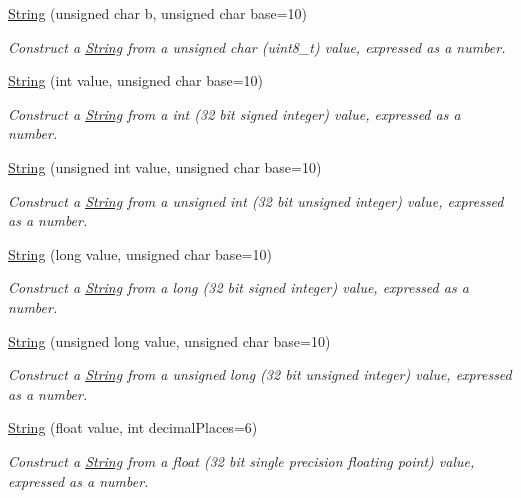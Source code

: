 \begin{DoxyCompactItemize}
\hyperlink{class_string_adb05525482f5991815322239e5504539}{String} (unsigned char b, unsigned char base=10)
\begin{DoxyCompactList}\small\item\em Construct a \hyperlink{class_string}{String} from a unsigned char (uint8\+\_\+t) value, expressed as a number. \end{DoxyCompactList}\item 
\hyperlink{class_string_a5528e1c6d322a9ee21f155c291ea67d1}{String} (int value, unsigned char base=10)
\begin{DoxyCompactList}\small\item\em Construct a \hyperlink{class_string}{String} from a int (32 bit signed integer) value, expressed as a number. \end{DoxyCompactList}\item 
\hyperlink{class_string_a53134e2b38eb0d114f886e807a3753ae}{String} (unsigned int value, unsigned char base=10)
\begin{DoxyCompactList}\small\item\em Construct a \hyperlink{class_string}{String} from a unsigned int (32 bit unsigned integer) value, expressed as a number. \end{DoxyCompactList}\item 
\hyperlink{class_string_a868687056546919b7109c0801d75ec83}{String} (long value, unsigned char base=10)
\begin{DoxyCompactList}\small\item\em Construct a \hyperlink{class_string}{String} from a long (32 bit signed integer) value, expressed as a number. \end{DoxyCompactList}\item 
\hyperlink{class_string_abdad234c756b44cce55c75db24fddecf}{String} (unsigned long value, unsigned char base=10)
\begin{DoxyCompactList}\small\item\em Construct a \hyperlink{class_string}{String} from a unsigned long (32 bit unsigned integer) value, expressed as a number. \end{DoxyCompactList}\item 
\hyperlink{class_string_adef4f199739444a78803c4043ad3e228}{String} (float value, int decimal\+Places=6)
\begin{DoxyCompactList}\small\item\em Construct a \hyperlink{class_string}{String} from a float (32 bit single precision floating point) value, expressed as a number. \end{DoxyCompactList}\item 

\end{DoxyCompactItemize}
